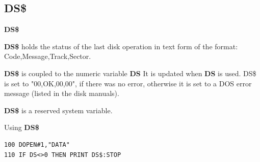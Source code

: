 
\newpage
\subsection{DS\$}
\begin{description}[leftmargin=2cm,style=nextline]
\item [Format:] {\bf DS\$}
\item [Usage:]  {\bf DS\$} holds the status of the last disk operation
                in text form of the format:
                Code,Message,Track,Sector.

                {\bf DS\$} is coupled to the numeric variable {\bf DS}
                It is updated when {\bf DS} is used.
                DS\$ is set to "00,OK,00,00", if there was no error, otherwise
                it is set to a DOS error message (listed in the
                disk manuals).
\item[Remarks:] {\bf DS\$} is a reserved system variable.

\item [Example:] Using {\bf DS\$}
\begin{tcolorbox}[colback=black,coltext=white]
\verbatimfont{\codefont}
\begin{verbatim}
100 DOPEN#1,"DATA"
110 IF DS<>0 THEN PRINT DS$:STOP
\end{verbatim}
\end{tcolorbox}
\end{description}


\newpage
